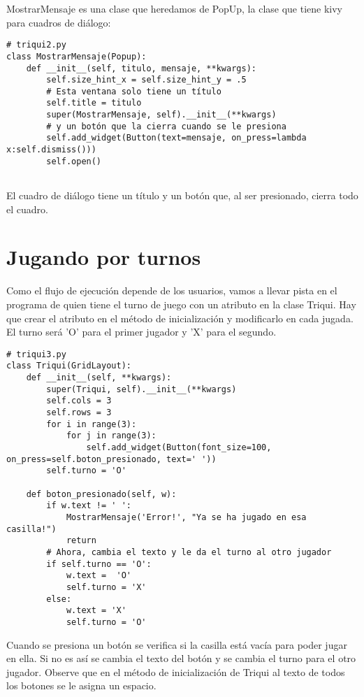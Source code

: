 MostrarMensaje es una clase que heredamos de PopUp, la clase que tiene kivy para
cuadros de diálogo:

\beforeverb
\begin{verbatim}
# triqui2.py
class MostrarMensaje(Popup): 
    def __init__(self, titulo, mensaje, **kwargs):
        self.size_hint_x = self.size_hint_y = .5
        # Esta ventana solo tiene un título
        self.title = titulo
        super(MostrarMensaje, self).__init__(**kwargs)
        # y un botón que la cierra cuando se le presiona
        self.add_widget(Button(text=mensaje, on_press=lambda x:self.dismiss()))
        self.open()


\end{verbatim}
\afterverb

El cuadro de diálogo tiene un título y un botón que, al ser presionado, cierra
todo el cuadro.

\section{Jugando por turnos}

Como el flujo de ejecución depende de los usuarios, vamos a llevar pista en el 
programa de quien tiene el turno de juego con un atributo en la clase Triqui.
Hay que crear el atributo en el método de inicialización y modificarlo en 
cada jugada. El turno será 'O' para el primer jugador y 'X' para el segundo.

\beforeverb
\begin{verbatim}
# triqui3.py
class Triqui(GridLayout):
    def __init__(self, **kwargs):
        super(Triqui, self).__init__(**kwargs)
        self.cols = 3
        self.rows = 3
        for i in range(3):
            for j in range(3):
                self.add_widget(Button(font_size=100, on_press=self.boton_presionado, text=' '))
        self.turno = 'O'

    def boton_presionado(self, w):
        if w.text != ' ':
            MostrarMensaje('Error!', "Ya se ha jugado en esa casilla!")
            return
        # Ahora, cambia el texto y le da el turno al otro jugador
        if self.turno == 'O':
            w.text =  'O'
            self.turno = 'X'
        else:
            w.text = 'X'
            self.turno = 'O'
\end{verbatim}
\afterverb

Cuando se presiona un botón se verifica si la casilla está vacía para poder jugar en 
ella. Si no es así se cambia el texto del botón y se cambia el turno para el otro 
jugador. Observe que en el método de inicialización de Triqui al texto de todos los 
botones se le asigna un espacio.

